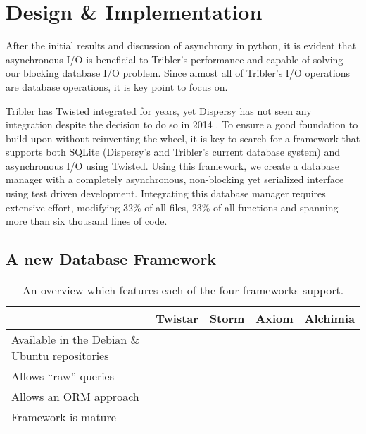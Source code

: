 \chapter{Design \& Implementation}
\label{cpt:design_implementation}

After the initial results and discussion of asynchrony in python, it is evident that asynchronous I/O is beneficial to Tribler's performance and capable of solving our blocking database I/O problem.
Since almost all of Tribler's I/O operations are database operations, it is key point to focus on.

Tribler has Twisted integrated for years, yet Dispersy has not seen any integration despite the decision to do so in 2014 \cite{pouwelse2013consider}.
To ensure a good foundation to build upon without reinventing the wheel, it is key to search for a framework that supports both SQLite (Dispersy's and Tribler's current database system) and asynchronous I/O using Twisted.
Using this framework, we create a database manager with a completely asynchronous, non-blocking yet serialized interface using test driven development.
Integrating this database manager requires extensive effort, modifying 32\% of all files, 23\% of all functions and spanning more than six thousand lines of code.

\section{A new Database Framework}

\begin{table}[]
	\centering
	\caption{An overview which features each of the four frameworks support.}
	\label{table:database_frameworks_comparison}
	\begin{tabular}{l|c|c|c|c|}
		\cline{2-5}
		& \textbf{Twistar} & \textbf{Storm} & \textbf{Axiom} & \textbf{Alchimia} \\ \hline
	\multicolumn{1}{|p{4cm}|}{Available in the Debian \& Ubuntu repositories} 	& \xmark & \cmark & \cmark & \xmark \\ \hline
	\multicolumn{1}{|l|}{Allows \enquote{raw} queries} 							& \cmark & \cmark & \cmark & \cmark \\ \hline
	\multicolumn{1}{|l|}{Allows an ORM approach} 								& \cmark & \cmark & \cmark & \xmark \\ \hline
	\multicolumn{1}{|l|}{Framework is mature} 									& \cmark & \cmark & \cmark & \xmark \\ \hline
	\end{tabular}
\end{table}

